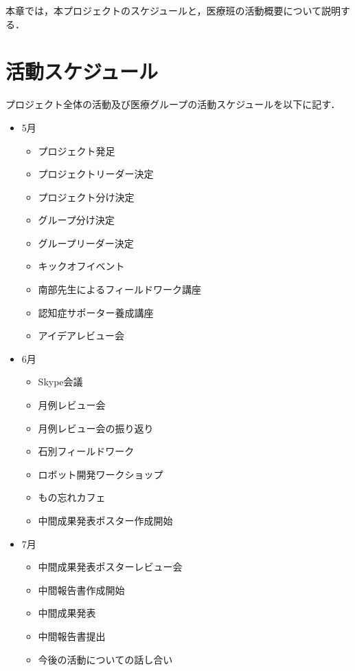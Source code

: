\documentclass[../report]{subfiles}
\begin{document}
本章では，本プロジェクトのスケジュールと，医療班の活動概要について説明する．

\section{活動スケジュール}
プロジェクト全体の活動及び医療グループの活動スケジュールを以下に記す．
\begin{itemize}
    \item[] 5月
    \begin{itemize}
        \item プロジェクト発足
        \item プロジェクトリーダー決定
        \item プロジェクト分け決定
        \item グループ分け決定
        \item グループリーダー決定
        \item キックオフイベント
        \item 南部先生によるフィールドワーク講座
        \item 認知症サポーター養成講座
        \item アイデアレビュー会
    \end{itemize}
    \item[] 6月
    \begin{itemize}
        \item Skype会議
        \item 月例レビュー会
        \item 月例レビュー会の振り返り
        \item 石別フィールドワーク
        \item ロボット開発ワークショップ
        \item もの忘れカフェ
        \item 中間成果発表ポスター作成開始
    \end{itemize}
    \item[] 7月
    \begin{itemize}
        \item 中間成果発表ポスターレビュー会
        \item 中間報告書作成開始
        \item 中間成果発表
        \item 中間報告書提出
        \item 今後の活動についての話し合い
    \end{itemize}
\end{itemize}
\end{document}

